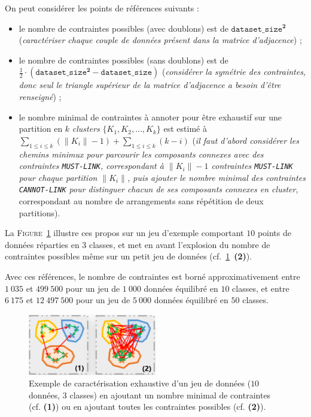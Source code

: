 			\begin{leftBarAuthorOpinion}
				On peut considérer les points de références suivants :
				\begin{itemize}
					\item le nombre de contraintes possibles (avec doublons) est de $\texttt{dataset\_size}^{\textbf{2}}$ (\textit{caractériser chaque couple de données présent dans la matrice d'adjacence}) ;
					\item le nombre de contraintes possibles (sans doublons) est de $\frac{1}{2} \cdot (\texttt{dataset\_size}^{\textbf{2}} - \texttt{dataset\_size})$ (\textit{considérer la symétrie des contraintes, donc seul le triangle supérieur de la matrice d'adjacence a besoin d'être renseigné}) ;
					\item le nombre minimal de contraintes à annoter pour être exhaustif sur une partition en $k$ \textit{clusters} $\{K_{1}, K_{2}, ..., K_{k}\} $ est estimé à ${\displaystyle \sum\limits_{1 \leq i \leq k}{(\|K_{i}\|-1)} + \sum\limits_{1 \leq i \leq k}{(k-i)}} $
					(\textit{il faut d'abord considérer les chemins minimux pour parcourir les composants connexes avec des contraintes \texttt{MUST-LINK}, correspondant à $\|K_{i}\|-1$ contraintes \texttt{MUST-LINK} pour chaque partition $\|K_{i}\|$, puis ajouter le nombre minimal des contraintes \texttt{CANNOT-LINK} pour distinguer chacun de ses composants connexes en \textit{cluster}}, correspondant au nombre de arrangements sans répétition de deux partitions).
				\end{itemize}
				La \textsc{Figure~\ref{figure:4.3.3-ETUDE-COUT-NOMBRE-CONTRAINTES-EXEMPLES}} illustre ces propos sur un jeu d'exemple comportant $10$ points de données réparties en $3$ classes, et met en avant l'explosion du nombre de contraintes possibles même sur un petit jeu de données (cf.~\ref{figure:4.3.3-ETUDE-COUT-NOMBRE-CONTRAINTES-EXEMPLES}~\textbf{(2)}).
				
				Avec ces références, le nombre de contraintes est borné approximativement
				entre $1~035$ et $499~500$ pour un jeu de $1~000$ données équilibré en $10$ classes,
				et entre $6~175$ et $12~497~500$ pour un jeu de $5~000$ données équilibré en $50$ classes.
				\begin{figure}[H]
					\centering
					\includegraphics[width=0.5\textwidth]{figures/etude-nombre-contraintes-2-bornes-limites}
					\caption{
						Exemple de caractérisation exhaustive d'un jeu de données ($10$ données, $3$ classes) en ajoutant un nombre minimal de contraintes (cf. \textbf{(1)}) ou en ajoutant toutes les contraintes possibles (cf. \textbf{(2)}).
					}
					\label{figure:4.3.3-ETUDE-COUT-NOMBRE-CONTRAINTES-EXEMPLES}
				\end{figure}
			\end{leftBarAuthorOpinion}

